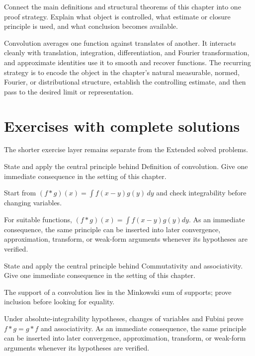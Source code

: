 \begin{problem}\label{prob:iii10-problem-12}
Connect the main definitions and structural theorems of this chapter into one proof strategy. Explain what object is controlled, what estimate or closure principle is used, and what conclusion becomes available.
\end{problem}
\begin{solution}
Convolution averages one function against translates of another. It interacts cleanly with translation, integration, differentiation, and Fourier transformation, and approximate identities use it to smooth and recover functions. The recurring strategy is to encode the object in the chapter's natural measurable, normed, Fourier, or distributional structure, establish the controlling estimate, and then pass to the desired limit or representation.
\end{solution}
\section{Exercises with complete solutions}
The shorter exercise layer remains separate from the Extended solved problems.

\begin{exercise}\label{exr:iii10-01}
State and apply the central principle behind Definition of convolution. Give one immediate consequence in the setting of this chapter.
\end{exercise}
\begin{hint}
Start from \((f*g)(x)=\int f(x-y)g(y)\,dy\) and check integrability before changing variables.
\end{hint}
\begin{solution}
For suitable functions, $(f*g)(x)=\int f(x-y)g(y)dy$. As an immediate consequence, the same principle can be inserted into later convergence, approximation, transform, or weak-form arguments whenever its hypotheses are verified.
\end{solution}

\begin{exercise}\label{exr:iii10-02}
State and apply the central principle behind Commutativity and associativity. Give one immediate consequence in the setting of this chapter.
\end{exercise}
\begin{hint}
The support of a convolution lies in the Minkowski sum of supports; prove inclusion before looking for equality.
\end{hint}
\begin{solution}
Under absolute-integrability hypotheses, changes of variables and Fubini prove $f*g=g*f$ and associativity. As an immediate consequence, the same principle can be inserted into later convergence, approximation, transform, or weak-form arguments whenever its hypotheses are verified.
\end{solution}

